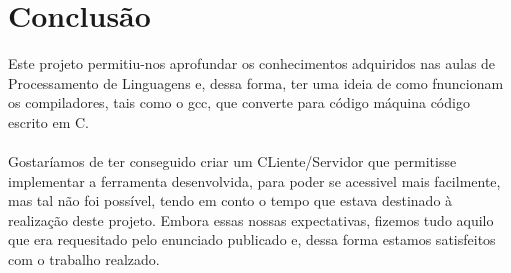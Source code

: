 \documentclass[a4paper]{report}
\begin{document}
\paragraph{}






\newpage
\section{Conclusão}
Este projeto permitiu-nos aprofundar os conhecimentos adquiridos nas aulas de Processamento de Linguagens e, dessa forma, ter uma ideia de como fnuncionam os compiladores, tais como o gcc, que converte para código máquina código escrito em C. 
\paragraph{}
Gostaríamos de ter conseguido criar um CLiente/Servidor que permitisse implementar a ferramenta desenvolvida, para poder se acessivel mais facilmente, mas tal não foi possível, tendo em conto o tempo que estava destinado à realização deste projeto. Embora essas nossas expectativas, fizemos tudo aquilo que era requesitado pelo enunciado publicado e, dessa forma estamos satisfeitos com o trabalho realzado.
\end{document}
